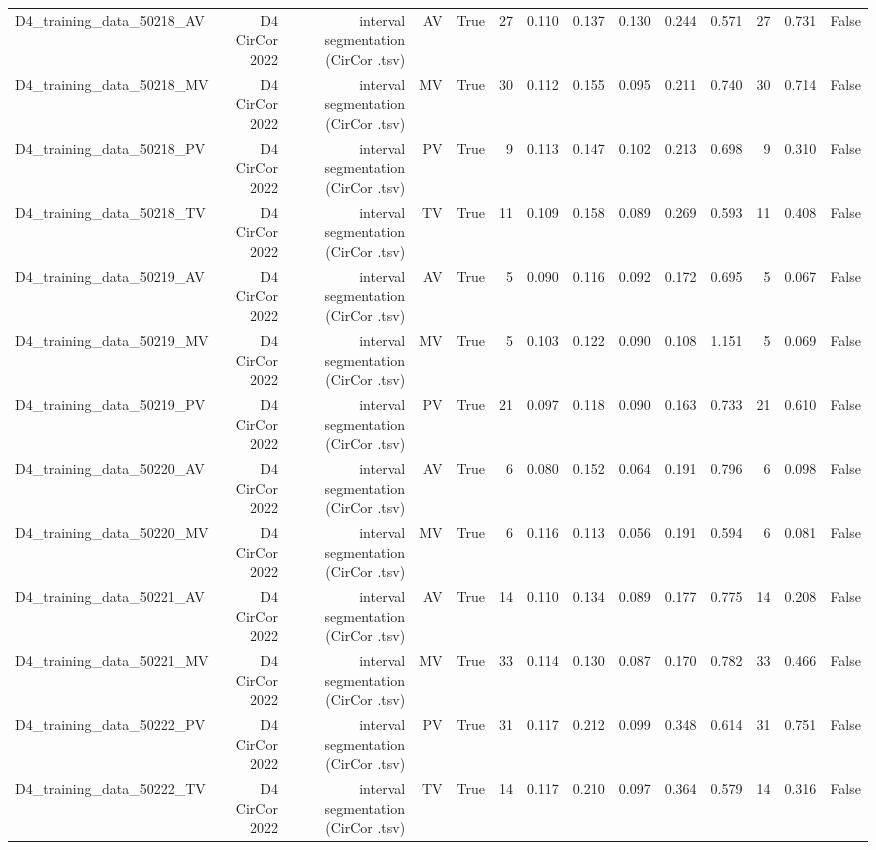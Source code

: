 \begin{table}[htbp]
\begin{tabular}{lrrrrrrrrrrrrr}
    D4\_training\_data\_50218\_AV & D4 CirCor 2022 & interval segmentation (CirCor .tsv) & AV & True & 27 & 0.110 & 0.137 & 0.130 & 0.244 & 0.571 & 27 & 0.731 & False \\
    D4\_training\_data\_50218\_MV & D4 CirCor 2022 & interval segmentation (CirCor .tsv) & MV & True & 30 & 0.112 & 0.155 & 0.095 & 0.211 & 0.740 & 30 & 0.714 & False \\
    D4\_training\_data\_50218\_PV & D4 CirCor 2022 & interval segmentation (CirCor .tsv) & PV & True & 9 & 0.113 & 0.147 & 0.102 & 0.213 & 0.698 & 9 & 0.310 & False \\
    D4\_training\_data\_50218\_TV & D4 CirCor 2022 & interval segmentation (CirCor .tsv) & TV & True & 11 & 0.109 & 0.158 & 0.089 & 0.269 & 0.593 & 11 & 0.408 & False \\
    D4\_training\_data\_50219\_AV & D4 CirCor 2022 & interval segmentation (CirCor .tsv) & AV & True & 5 & 0.090 & 0.116 & 0.092 & 0.172 & 0.695 & 5 & 0.067 & False \\
    D4\_training\_data\_50219\_MV & D4 CirCor 2022 & interval segmentation (CirCor .tsv) & MV & True & 5 & 0.103 & 0.122 & 0.090 & 0.108 & 1.151 & 5 & 0.069 & False \\
    D4\_training\_data\_50219\_PV & D4 CirCor 2022 & interval segmentation (CirCor .tsv) & PV & True & 21 & 0.097 & 0.118 & 0.090 & 0.163 & 0.733 & 21 & 0.610 & False \\
    D4\_training\_data\_50220\_AV & D4 CirCor 2022 & interval segmentation (CirCor .tsv) & AV & True & 6 & 0.080 & 0.152 & 0.064 & 0.191 & 0.796 & 6 & 0.098 & False \\
    D4\_training\_data\_50220\_MV & D4 CirCor 2022 & interval segmentation (CirCor .tsv) & MV & True & 6 & 0.116 & 0.113 & 0.056 & 0.191 & 0.594 & 6 & 0.081 & False \\
    D4\_training\_data\_50221\_AV & D4 CirCor 2022 & interval segmentation (CirCor .tsv) & AV & True & 14 & 0.110 & 0.134 & 0.089 & 0.177 & 0.775 & 14 & 0.208 & False \\
    D4\_training\_data\_50221\_MV & D4 CirCor 2022 & interval segmentation (CirCor .tsv) & MV & True & 33 & 0.114 & 0.130 & 0.087 & 0.170 & 0.782 & 33 & 0.466 & False \\
    D4\_training\_data\_50222\_PV & D4 CirCor 2022 & interval segmentation (CirCor .tsv) & PV & True & 31 & 0.117 & 0.212 & 0.099 & 0.348 & 0.614 & 31 & 0.751 & False \\
    D4\_training\_data\_50222\_TV & D4 CirCor 2022 & interval segmentation (CirCor .tsv) & TV & True & 14 & 0.117 & 0.210 & 0.097 & 0.364 & 0.579 & 14 & 0.316 & False \\

\end{tabular}
\end{table}
